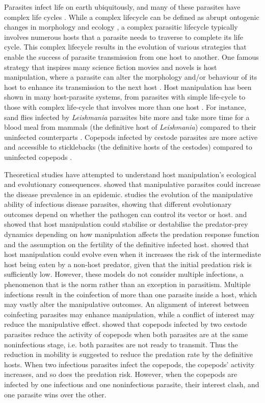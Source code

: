 \documentclass[11pt]{article}
\begin{document}
Parasites infect life on earth ubiquitously, and many of these parasites have complex life cycles \cite{zimmer:book:2001}. 
While a complex lifecycle can be defined as abrupt ontogenic changes in morphology and ecology \cite{Benesh:2016dj}, a complex parasitic lifecycle typically involves numerous hosts that a parasite needs to traverse to complete its life cycle. 
This complex lifecycle results in the evolution of various strategies that enable the success of parasite transmission from one host to another. 
One famous strategy that inspires many science fiction movies and novels is host manipulation, where a parasite can alter the morphology and/or behaviour of its  host to enhance its transmission to the next host \cite{Hughes2012}. 
Host manipulation has been shown in many host-parasite systems, from parasites with simple life-cycle to those with complex life-cycle that involves more than one host \cite{Hughes2012, molyneux_jefferies1986}. 
For instance, sand flies infected by \textit{Leishmania} parasites bite more and take more time for a blood meal from mammals (the definitive host of \textit{Leishmania}) compared to their uninfected counterparts \cite{ Rogers2007}. 
Copepods infected by cestode parasites are more active and accessible to sticklebacks (the definitive hosts of the cestodes) compared to uninfected copepods \cite{Wedekind1996}.


Theoretical studies have attempted to understand host manipulation's ecological and evolutionary consequences. \cite{Roosien2013, Hosack2008} showed that manipulative parasites could increase the disease prevalence in an epidemic. \cite{Gandon2018} studies the evolution of the manipulative ability of infectious disease parasites, showing that different evolutionary outcomes depend on whether the pathogen can control its vector or host.
\cite{Hadeler1989, Fenton2006} and \cite{Rogawa2018} showed that host manipulation could stabilise or destabilise the predator-prey dynamics depending on how manipulation affects the predation response function and the assumption on the fertility of the definitive infected host. \cite{Seppl2008} showed that host manipulation could evolve even when it increases the risk of the intermediate host being eaten by a non-host predator, given that the initial predation risk is sufficiently low. 
However, these models do not consider multiple infections, a phenomenon that is the norm rather than an exception in parasitism. Multiple infections result in the coinfection of more than one parasite inside a host, which may vastly alter the manipulative outcomes. 
An alignment of interest between coinfecting parasites may enhance manipulation, while a conflict of interest may reduce the manipulative effect. 
\cite{Hafer:2015gl} showed that copepods infected by two cestode parasites reduce the activity of copepods when both parasites are at the same noninfectious stage, i.e. both parasites are not ready to transmit. Thus the reduction in mobility is suggested to reduce the predation rate by the definitive hosts. When two infectious parasites infect the copepods, the copepods' activity increases, and so does the predation risk. 
However, when the copepods are infected by one infectious and one noninfectious parasite, their interest clash, and one parasite wins over the other. 
\end{document}
